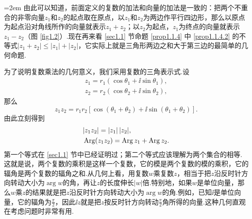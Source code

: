 \noindent\begin{minipage}{0.4\textwidth}
  \centering
\end{minipage}
\begin{minipage}{0.6\textwidth}\parindent=2em
  由此可以知道，前面定义的复数的加法和向量的加法是一致的：把两个不重合的非零向量$z_1$和$z_2$的起点取在原点，以$z_1$和$z_2$为两边作平行四边形，那么以原点为起点沿对角线所作的向量就表示$z_1+z_2$；以$z_2$为起点，$z_1$为终点的向量就表示$z_1-z_2$（图 \ref{fig1.2}）.现在再来看 \ref{sec1.1} 节命题 \ref{prop1.1.4} 中 \ref{prop1.1.4.2} 的不等式$|z_1+z_2|\le|z_1|+|z_2|$，它实际上就是三角形两边之和大于第三边的最简单的几何命题.
\end{minipage}

为了说明复数乘法的几何意义，我们采用复数的三角表示式.设
\begin{gather*}
  z_1 = r_1(\cos\theta_1 + \ii\sin\theta_1),\\
  z_2 = r_2(\cos\theta_2 + \ii\sin\theta_2),
\end{gather*}
那么
\[
  z_1z_2 = r_1r_2[\cos(\theta_1 + \theta_2) + \ii\sin(\theta_1 + \theta_2)].
\]
由此立刻得到
\begin{align*}
  & |z_1z_2| = |z_1|\,|z_2|,\\
  & \operatorname{Arg}(z_1z_2) = \operatorname{Arg} z_1 + \operatorname{Arg} z_2.
\end{align*}
第一个等式在 \ref{sec1.1} 节中已经证明过；第二个等式应该理解为两个集合的相等.这就是说，两个复数的乘积是这样一个复数，它的模是两个复数的模的乘积，它的辐角是两个复数的辐角之和.从几何上看，用复数$w$乘复数$z$，相当于把$z$沿反时针方向转动大小为$\arg w$的角，再让$z$的长度伸长$|w|$倍.特别地，如果$w$是单位向量，那么$w$乘$z$的结果就是把$z$沿反时针方向转动大小为$\arg w$的角.例如，已知$\ii$是单位向量，它的辐角为$\frac\pi2$，因此$\ii z$就是把$z$按反时针方向转动$\frac\pi2$角所得的向量.这种几何直观在考虑问题时非常有用.

